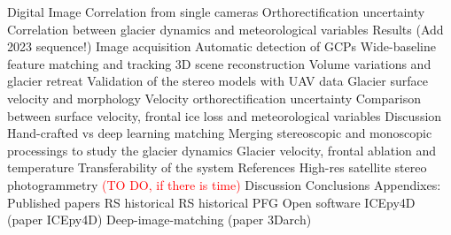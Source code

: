 \documentclass[12pt]{article}
\begin{document}
\begin{outline}[enumerate]
    \3 Digital Image Correlation from single cameras
    \4 Orthorectification uncertainty
    \3 Correlation between glacier dynamics and meteorological variables
    \2 Results {\color{red} (Add 2023 sequence!)}
    \3 Image acquisition
    \3 Automatic detection of GCPs
    \3 Wide-baseline feature matching and tracking
    \3 3D scene reconstruction
    \3 Volume variations and glacier retreat
    \3 Validation of the stereo models with UAV data
    \3 Glacier surface velocity and morphology
    \3 Velocity orthorectification uncertainty
    \3 Comparison between surface velocity, frontal ice loss and meteorological
    variables
    \2 Discussion
    \3 Hand-crafted vs deep learning matching
    \3 Merging stereoscopic and monoscopic processings to study the glacier
    dynamics
    \3 Glacier velocity, frontal ablation and temperature
    \3 Transferability of the system
    \2 References
    \1 High-res satellite stereo photogrammetry  \textcolor{red}{(TO DO, if there is
        time)}
    \1 Discussion
    \2
    \1 Conclusions
    \1 Appendixes:
    \2 Published papers
    \3 RS historical
    \3 RS historical
    \3 PFG
    \2 Open software
    \3 ICEpy4D (paper ICEpy4D)
    \3 Deep-image-matching (paper 3Darch)

\end{outline}
\end{document}

